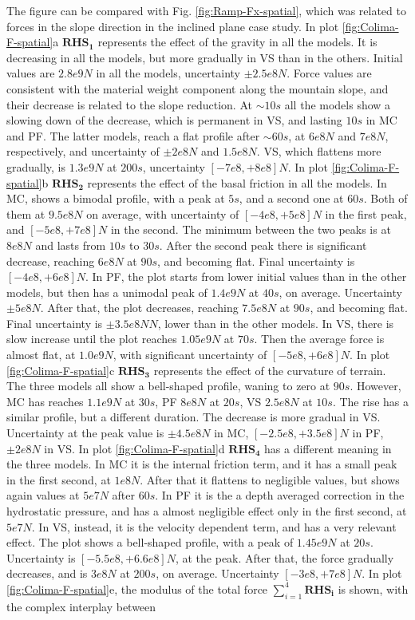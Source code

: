 \documentclass{article}
\begin{document}
The figure can be compared with Fig. \ref{fig:Ramp-Fx-spatial}, which was related to forces in the slope direction in the inclined plane case study. In plot \ref{fig:Colima-F-spatial}a $\boldsymbol{RHS_1}$ represents the effect of the gravity in all the models. It is decreasing in all the models, but more gradually in VS than in the others. Initial values are $2.8e9 N$ in all the models, uncertainty $\pm 2.5e8 N$. Force values are consistent with the material weight component along the mountain slope, and their decrease is related to the slope reduction. At $\sim 10 s$ all the models show a slowing down of the decrease, which is permanent in VS, and lasting $10 s$ in MC and PF. The latter models, reach a flat profile after $\sim 60 s$, at $6e8 N$ and $7e8 N$, respectively, and uncertainty of $\pm 2e8 N$ and $1.5e8 N$. VS, which flattens more gradually, is $1.3e9 N$ at $200 s$, uncertainty $[-7e8,+8e8] N$. In plot  \ref{fig:Colima-F-spatial}b $\boldsymbol{RHS_2}$ represents the effect of the basal friction in all the models. In MC, shows a bimodal profile, with a peak at $5 s$, and a second one at $60 s$. Both of them at $9.5e8 N$ on average, with uncertainty of $[-4e8,+5e8] N$ in the first peak, and $[-5e8,+7e8] N$ in the second. The minimum between the two peaks is at $8e8 N$ and lasts from $10 s$ to $30 s$. After the second peak there is significant decrease, reaching $6e8 N$ at $90 s$, and becoming flat. Final uncertainty is $[-4e8, +6e8] N$. In PF, the plot starts from lower initial values than in the other models, but then has a unimodal peak of $1.4e9 N$ at $40 s$, on average. Uncertainty $\pm 5e8 N$. After that, the plot decreases, reaching $7.5e8 N$ at $90 s$, and becoming flat. Final uncertainty is $\pm 3.5e8 N N$, lower than in the other models. In VS, there is slow increase until the plot reaches $1.05e9 N$ at $70 s$. Then the average force is almost flat, at $1.0e9 N$, with significant uncertainty of $[-5e8,+6e8] N$. In plot \ref{fig:Colima-F-spatial}c $\boldsymbol{RHS_3}$ represents the effect of the curvature of terrain. The three models all show a bell-shaped profile, waning to zero at $90 s$. However, MC has reaches $1.1e9 N$ at $30 s$, PF $8e8 N$ at $20 s$, VS $2.5e8 N$ at $10 s$. The rise has a similar profile, but a different duration. The decrease is more gradual in VS. Uncertainty at the peak value is $\pm 4.5e8 N$ in MC, $[-2.5e8,+3.5e8] N$ in PF, $\pm 2e8 N$ in VS. In plot \ref{fig:Colima-F-spatial}d $\boldsymbol{RHS_4}$ has a different meaning in the three models. In MC it is the internal friction term, and it has a small peak in the first second, at $1e8 N$. After that it flattens to negligible values, but shows again values at $5e7 N$ after $60 s$. In PF it is the a depth averaged correction in the hydrostatic pressure, and has a almost negligible effect only in the first second, at $5e7 N$. In VS, instead, it is the velocity dependent term, and has a very relevant effect. The plot shows a bell-shaped profile, with a peak of $1.45e9 N$ at $20 s$. Uncertainty is $[-5.5e8, +6.6e8] N$, at the peak. After that, the force gradually decreases, and is $3e8 N$ at $200 s$, on average. Uncertainty $[-3e8, +7e8] N$. In plot \ref{fig:Colima-F-spatial}e, the modulus of the total force $\sum^4_{i=1}\boldsymbol{RHS_i}$ is shown, with the complex interplay between 
\end{document}
